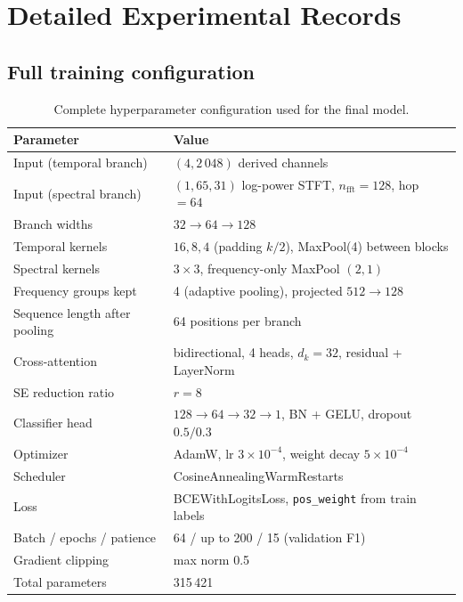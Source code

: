 \chapter{Detailed Experimental Records}
\label{annexe:runs}

\section{Full training configuration}

\begin{table}[H]
\centering
\caption{Complete hyperparameter configuration used for the final model.}
\renewcommand{\arraystretch}{1.3}
\small
\begin{tabular}{|l|l|}
\hline
\textbf{Parameter} & \textbf{Value} \\
\hline
Input (temporal branch) & $(4, 2\,048)$ derived channels \\
\hline
Input (spectral branch) & $(1, 65, 31)$ log-power STFT, $n_{\text{fft}}=128$, hop $=64$ \\
\hline
Branch widths & $32 \to 64 \to 128$ \\
\hline
Temporal kernels & $16, 8, 4$ (padding $k/2$), MaxPool(4) between blocks \\
\hline
Spectral kernels & $3 \times 3$, frequency-only MaxPool $(2,1)$ \\
\hline
Frequency groups kept & 4 (adaptive pooling), projected $512 \to 128$ \\
\hline
Sequence length after pooling & 64 positions per branch \\
\hline
Cross-attention & bidirectional, 4 heads, $d_k = 32$, residual + LayerNorm \\
\hline
SE reduction ratio & $r = 8$ \\
\hline
Classifier head & $128 \to 64 \to 32 \to 1$, BN + GELU, dropout $0.5 / 0.3$ \\
\hline
Optimizer & AdamW, lr $3\times10^{-4}$, weight decay $5\times10^{-4}$ \\
\hline
Scheduler & CosineAnnealingWarmRestarts \\
\hline
Loss & BCEWithLogitsLoss, \texttt{pos\_weight} from train labels \\
\hline
Batch / epochs / patience & 64 / up to 200 / 15 (validation F1) \\
\hline
Gradient clipping & max norm 0.5 \\
\hline
Total parameters & 315\,421 \\
\hline
\end{tabular}
\end{table}

